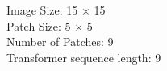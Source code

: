\documentclass[preview]{standalone}
\begin{document}
\begin{center}
Image Size: 15 $\times$ 15 \\
            Patch Size: 5 $\times$ 5 \\
            Number of Patches: 9 \\
            Transformer sequence length: 9
\end{center}
\end{document}
